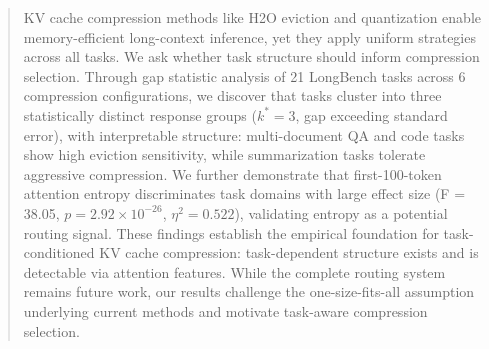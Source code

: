 \begin{abstract}
KV cache compression methods like H2O eviction and quantization enable memory-efficient long-context inference, yet they apply uniform strategies across all tasks. We ask whether task structure should inform compression selection. Through gap statistic analysis of 21 LongBench tasks across 6 compression configurations, we discover that tasks cluster into three statistically distinct response groups ($k^* = 3$, gap exceeding standard error), with interpretable structure: multi-document QA and code tasks show high eviction sensitivity, while summarization tasks tolerate aggressive compression. We further demonstrate that first-100-token attention entropy discriminates task domains with large effect size (F = 38.05, $p = 2.92 \times 10^{-26}$, $\eta^2 = 0.522$), validating entropy as a potential routing signal. These findings establish the empirical foundation for task-conditioned KV cache compression: task-dependent structure exists and is detectable via attention features. While the complete routing system remains future work, our results challenge the one-size-fits-all assumption underlying current methods and motivate task-aware compression selection.
\end{abstract}
